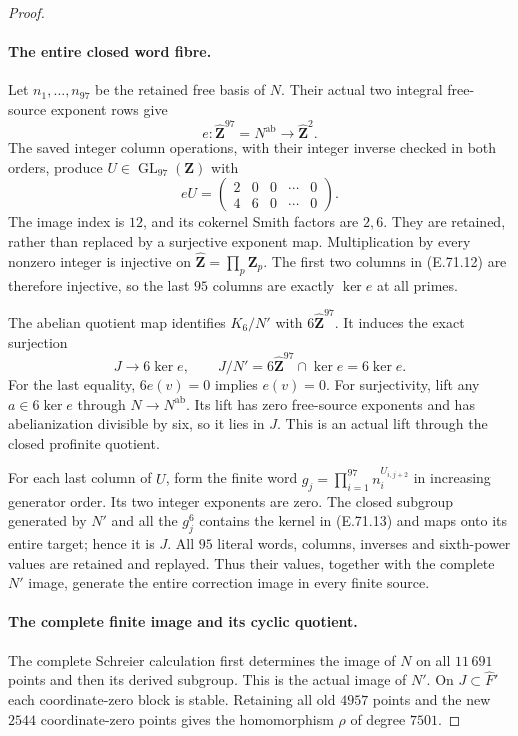 \begin{proof}
\paragraph{The entire closed word fibre.}
Let $n_1,\ldots,n_{97}$ be the retained free basis of
$N$. Their actual two integral free-source exponent
rows give
\[
 e:\widehat{\mathbf Z}^{97}=N^{\mathrm{ab}}
                  \longrightarrow\widehat{\mathbf Z}^{2}.
 \tag{E.71.11}
\]
The saved integer column operations, with their
integer inverse checked in both orders, produce
$U\in\operatorname{GL}_{97}(\mathbf Z)$ with
\[
 eU=\begin{pmatrix}2&0&0&\cdots&0\\4&6&0&\cdots&0\end{pmatrix}.
 \tag{E.71.12}
\]
The image index is $12$, and its cokernel Smith
factors are $2,6$. They are retained, rather than
replaced by a surjective exponent map. Multiplication
by every nonzero integer is injective on
$\widehat{\mathbf Z}=\prod_p\mathbf Z_p$.
The first two columns in (E.71.12) are therefore
injective, so the last $95$ columns are exactly
$\ker e$ at all primes.

The abelian quotient map identifies $K_6/N'$ with
$6\widehat{\mathbf Z}^{97}$. It induces the exact
surjection
\[
 J\longrightarrow6\ker e,
 \qquad
 J/N'=6\widehat{\mathbf Z}^{97}\cap\ker e=6\ker e.
 \tag{E.71.13}
\]
For the last equality, $6e(v)=0$ implies $e(v)=0$.
For surjectivity, lift any $a\in6\ker e$ through
$N\to N^{\mathrm{ab}}$. Its lift has zero free-source
exponents and has abelianization divisible by six,
so it lies in $J$. This is an actual lift through
the closed profinite quotient.

For each last column of $U$, form the finite word
$g_j=\prod_{i=1}^{97}n_i^{U_{i,j+2}}$ in increasing
generator order. Its two integer exponents are zero.
The closed subgroup generated by $N'$ and all the
$g_j^6$ contains the kernel in (E.71.13) and maps
onto its entire target; hence it is $J$. All $95$
literal words, columns, inverses and sixth-power
values are retained and replayed. Thus their values,
together with the complete $N'$ image, generate
the entire correction image in every finite source.

\paragraph{The complete finite image and its cyclic quotient.}
The complete Schreier calculation first determines
the image of $N$ on all $11\,691$ points and then
its derived subgroup. This is the actual image of
$N'$. On $J\subset\widehat F'$ each coordinate-zero
block is stable. Retaining all old $4957$ points and
the new $2544$ coordinate-zero points gives the
homomorphism $\rho$ of degree $7501$.


\end{proof}
